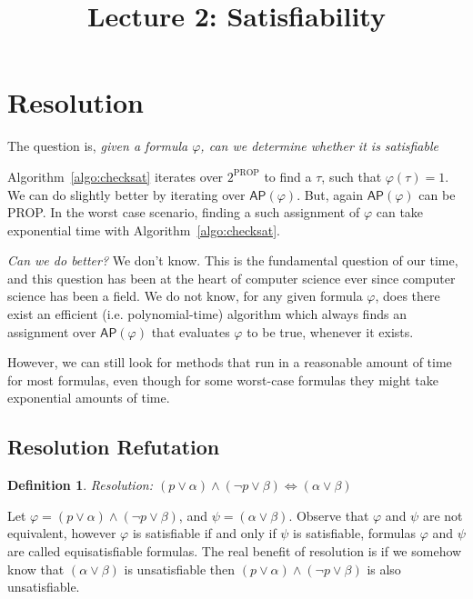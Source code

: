 \documentclass{article}
\newtheorem{definition}[theorem]{Definition}
\newcommand{\ap}[1]{\ensuremath{\mathsf{AP}{#1}}}
\begin{document}
\title{Lecture 2: Satisfiability}


\section{Resolution}
The question is, \emph{given a formula $\varphi$, can we determine whether it is satisfiable }

 \begin{algorithm}[H]

 	\caption{CheckSAT{($\varphi$)}\label{algo:checksat}}
 	\begin{algorithmic}[1]
 		\label{line:checksat:prop}
		 		\State

	 		\EndIf
 		\EndFor
 		\State
 	\end{algorithmic}
 \end{algorithm}
Algorithm~\ref{algo:checksat} iterates over $2^{\text{PROP}}$ to find a $\tau$, such that $\varphi(\tau)=1$. We can do slightly better by iterating over $\ap{(\varphi)}$. But, again $\ap{(\varphi)}$ can be PROP. In the worst case scenario, finding a such assignment of $\varphi$ can take exponential time with Algorithm~\ref{algo:checksat}.

\emph{Can we do better?} We don't know.
This is the fundamental question of our time, and this question has been at the heart of computer science ever since computer science has been a field.
We do not know, for any given formula $\varphi$, does there exist an efficient (i.e. polynomial-time) algorithm which always finds an assignment
over $\ap{(\varphi)}$ that evaluates $\varphi$ to be true, whenever it exists.

However, we can still look for methods that run in a reasonable amount of time for most formulas, even though for some worst-case formulas they might take exponential amounts of time.

\subsection{Resolution Refutation}
\begin{definition}
Resolution:  $(p \lor \alpha)\land (\lnot p \lor \beta) \iff (\alpha \lor \beta)$
\end{definition}
Let $\varphi = (p \lor \alpha)\land (\lnot p \lor \beta)$, and $\psi = (\alpha \lor \beta)$. Observe that $\varphi$ and $\psi$ are not equivalent, however $\varphi$ is satisfiable if and only if $\psi$ is satisfiable, formulas $\varphi$ and $\psi$ are called equisatisfiable formulas. The real benefit of resolution is if we somehow know that $(\alpha \lor \beta)$ is unsatisfiable then $(p \lor \alpha)\land (\lnot p \lor \beta)$ is also unsatisfiable.
\end{document}
